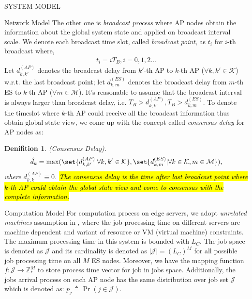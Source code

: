 \documentclass[10pt, conference, letterpaper]{IEEEtran}
\newtheorem{definition}{Denifition}
\newcommand{\domZ}{\mathbb{Z}_{*}}
\newcommand{\define}{\triangleq}
\DeclarePairedDelimiter\set\{\}
\newcommand{\apSet}{\mathcal{K}}
\newcommand{\esSet}{\mathcal{M}}
\newcommand{\jSet}{\mathcal{J}}
\begin{document}
\begin{section}{SYSTEM MODEL}
\begin{subsection}{Network Model}
            The other one is \emph{broadcast process} where AP nodes obtain the information about the global system state and applied on broadcast interval scale. We denote each broadcast time slot, called \emph{broadcast point}, as $t_i$ for $i$-th broadcast where,
            \begin{align}
                t_i = i T_B, i=0,1,2\dots
            \end{align} 
            Let $d^{(AP)}_{k,k'}$ denotes the broadcast delay from $k'$-th AP to $k$-th AP ($\forall k,k'\in\apSet$) w.r.t. the last broadcast point; let $d^{(ES)}_{k,m}$ denotes the broadcast delay from $m$-th ES to $k$-th AP ($\forall m\in\esSet$). It's reasonable to assume that the broadcast interval is always larger than broadcast delay, i.e. $T_B > d^{(AP)}_{k,k'}, T_B > d^{(ES)}_{k,m}$. To denote the timeslot where $k$-th AP could receive all the broadcast information thus obtain global state view, we come up with the concept called \emph{consensus delay} for AP nodes as:
            \begin{definition}
                (Consensus Delay).
                \begin{align}
                    \hat{d}_k = \max(\set{d^{(AP)}_{k,k'}|\forall k,k'\in\apSet}, \set{d^{(ES)}_{k,m}|\forall k\in\apSet,m\in\esSet}),
                \end{align}
                where $d^{(AP)}_{k,k} \equiv 0$. \hl{The consensus delay is the time after last broadcast point where $k$-th AP could obtain the global state view and come to consensus with the complete information.}
            \end{definition}
        \end{subsection}

        \begin{subsection}{Computation Model}
            For computation process on edge servers, we adopt \emph{unrelated machines} assumption in \cite{tan-online}, where the job processing time on different servers are machine dependent and variant of resource or VM (virtual machine) constraints.
            The maximum processing time in this system is bounded with $L_C$.
            The job space is denoted as $\jSet$ and its cardinality is denoted as $|\jSet|=(L_C)^M$ for all possible job processing time on all $M$ ES nodes.
            Moreover, we have the mapping function $f:\jSet \to \domZ^M$ to store process time vector for job in jobs space.
            Additionally, the jobs arrival process on each AP node has the same distribution over job set $\jSet$ which is denoted as: $p_j \define \Pr(j\in\jSet)$.
            

\end{subsection}
\end{section}
\end{document}
